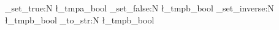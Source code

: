 \documentclass{article}
\begin{document}
\ExplSyntaxOn
\bool_set_true:N \l_tmpa_bool 
\bool_set_false:N \l_tmpb_bool 
\bool_set_inverse:N \l_tmpb_bool 
\bool_to_str:N \l_tmpb_bool 
\ExplSyntaxOff
\end{document}

